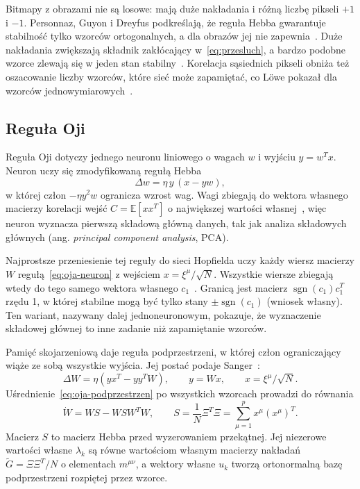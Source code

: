 Bitmapy z obrazami nie są losowe: mają duże nakładania i różną liczbę pikseli $+1$ i $-1$. Personnaz, Guyon i Dreyfus podkreślają, że reguła Hebba gwarantuje stabilność tylko wzorców ortogonalnych, a dla obrazów jej nie zapewnia~\cite[s.~L-362, L-364]{personnaz1985}. Duże nakładania zwiększają składnik zakłócający w~\eqref{eq:przesluch}, a bardzo podobne wzorce zlewają się w jeden stan stabilny~\cite[s.~2557]{hopfield1982}. Korelacja sąsiednich pikseli obniża też oszacowanie liczby wzorców, które sieć może zapamiętać, co Löwe pokazał dla wzorców jednowymiarowych~\cite[s.~1221--1222]{lowe1998}.

\subsection{Reguła Oji}
\label{sec:regula-oji}

Reguła Oji dotyczy jednego neuronu liniowego o wagach $w$ i wyjściu $y = w^T x$. Neuron uczy się zmodyfikowaną regułą Hebba
\begin{equation}
    \Delta w = \eta \, y \, (x - y w),
    \label{eq:oja-neuron}
\end{equation}
w której człon $-\eta y^2 w$ ogranicza wzrost wag. Wagi zbiegają do wektora własnego macierzy korelacji wejść $C = \mathbb{E}[x x^T]$ o największej wartości własnej~\cite[s.~268--270]{oja1982}, więc neuron wyznacza pierwszą składową główną danych, tak jak analiza składowych głównych (ang. \textit{principal component analysis}, PCA).

Najprostsze przeniesienie tej reguły do sieci Hopfielda uczy każdy wiersz macierzy $W$ regułą~\eqref{eq:oja-neuron} z wejściem $x = \xi^\mu / \sqrt{N}$. Wszystkie wiersze zbiegają wtedy do tego samego wektora własnego $c_1$~\cite[s.~465]{sanger1989}. Granicą jest macierz $\operatorname{sgn}(c_1) c_1^T$ rzędu 1, w której stabilne mogą być tylko stany $\pm \operatorname{sgn}(c_1)$ (wniosek własny). Ten wariant, nazywany dalej jednoneuronowym, pokazuje, że wyznaczenie składowej głównej to inne zadanie niż zapamiętanie wzorców.

Pamięć skojarzeniową daje reguła podprzestrzeni, w której człon ograniczający wiąże ze sobą wszystkie wyjścia. Jej postać podaje Sanger~\cite[s.~467]{sanger1989}:
\begin{equation}
    \Delta W = \eta \left(y x^T - y y^T W\right), \qquad y = W x, \qquad x = \xi^\mu / \sqrt{N}.
    \label{eq:oja-podprzestrzen}
\end{equation}
Uśrednienie~\eqref{eq:oja-podprzestrzen} po wszystkich wzorcach prowadzi do równania
\begin{equation}
    \dot W = W S - W S W^T W, \qquad S = \frac{1}{N} \Xi^T \Xi = \sum_{\mu=1}^{p} x^\mu (x^\mu)^T.
    \label{eq:oja-ode}
\end{equation}
Macierz $S$ to macierz Hebba przed wyzerowaniem przekątnej. Jej niezerowe wartości własne $\lambda_k$ są równe wartościom własnym macierzy nakładań $\tilde G = \Xi \Xi^T / N$ o elementach $m^{\mu\nu}$, a wektory własne $u_k$ tworzą ortonormalną bazę podprzestrzeni rozpiętej przez wzorce.

